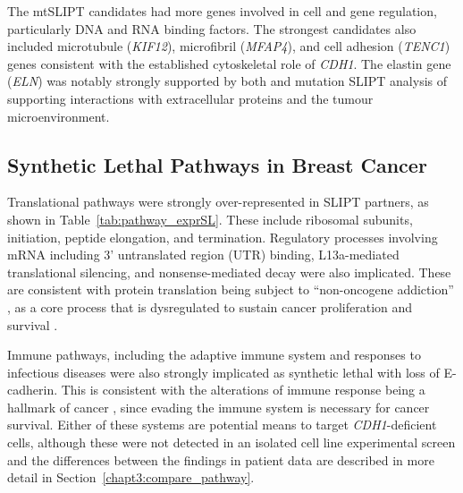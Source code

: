 The \acrshort{mtSLIPT} candidates had more genes involved in cell and gene regulation, particularly \acrshort{DNA} and \acrshort{RNA} binding factors. The strongest candidates also included microtubule (\textit{KIF12}), microfibril (\textit{MFAP4}), and cell adhesion (\textit{TENC1}) genes consistent with the established cytoskeletal role of \textit{CDH1}. The elastin gene (\textit{ELN}) was notably strongly supported by both  and \gls{mutation} \gls{SLIPT} analysis of  supporting interactions with extracellular proteins and the tumour microenvironment.


\subsection{Synthetic Lethal Pathways in Breast Cancer} \label{chapt3:exprSL_pathways}

Translational \glspl{pathway} were strongly over-represented in \gls{SLIPT} partners, as shown in Table~\ref{tab:pathway_exprSL}. These include ribosomal subunits, initiation, peptide elongation, and termination. Regulatory processes involving \acrshort{mRNA} including 3' untranslated region (UTR) binding, L13a-mediated translational silencing, and nonsense-mediated decay were also implicated. These are consistent with protein translation being subject to ``\gls{non-oncogene addiction}'' \citep{Luo2009}, as a core process that is dysregulated to sustain cancer proliferation and survival \citep{Gao2015}.

Immune \glspl{pathway}, including the adaptive immune system and responses to infectious diseases were also strongly implicated as \gls{synthetic lethal} with loss of \gls{E-cadherin}. This is consistent with the alterations of immune response being a hallmark of cancer \cite{Hanahan2000}, since evading the immune system is necessary for cancer survival. Either of these systems are potential means to target \textit{CDH1}-deficient cells, although these were not detected in an isolated cell line experimental screen \citep{Telford2015} and the differences between the findings in patient data are described in more detail in Section~\ref{chapt3:compare_pathway}.

